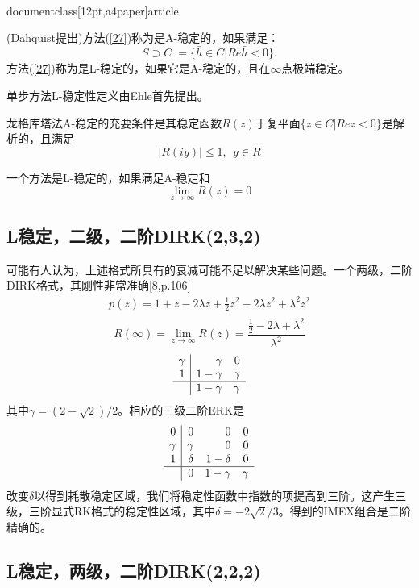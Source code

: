 \\documentclass[12pt,a4paper]{article}
\begin{document}
(Dahquist提出)方法(\ref{27})称为是A-稳定的，如果满足：
\begin{equation*}
S\supset C_{\_}=\{\bar{h}\in C|Re\bar{h}<0\}.
\end{equation*}
方法(\ref{27})称为是L-稳定的，如果它是A-稳定的，且在$\infty$点极端稳定。

单步方法L-稳定性定义由Ehle首先提出。

龙格库塔法A-稳定的充要条件是其稳定函数$R(z)$于复平面$\{z\in C|Rez<0\}$是解析的，且满足
\begin{equation}
|R(iy)|\le 1,~~y\in R
\end{equation}

一个方法是L-稳定的，如果满足A-稳定和
\begin{equation*}
\lim\limits_{z\to\infty}R(z)=0
\end{equation*}
\subsection{L稳定，二级，二阶DIRK(2,3,2)}

可能有人认为，上述格式所具有的衰减可能不足以解决某些问题。一个两级，二阶DIRK格式，其刚性非常准确[8,p.106]
\begin{gather*}
p(z)=1+z-2\lambda z+\frac{1}{2}z^2-2\lambda z^2+\lambda^2z^2\\
\end{gather*}
\begin{equation*}
R(\infty)=\lim\limits_{z\to \infty}R(z)=\frac{\frac{1}{2}-2\lambda+\lambda^2}{\lambda^2}
\end{equation*}
\[
\begin{array}{r|rr}
\gamma & \gamma & 0\\1 & 1-\gamma & \gamma\\
\hline
& 1-\gamma & \gamma
\end{array}
\]
其中$\gamma=(2-\sqrt{2})/2$。相应的三级二阶ERK是
\[
\begin{array}{r|rrr}
0 & 0 & 0 & 0\\
\gamma & \gamma & 0 & 0 \\
1 & \delta& 1-\delta & 0\\
\hline
& 0 & 1-\gamma & \gamma
\end{array}
\]
改变$\delta$以得到耗散稳定区域，我们将稳定性函数中指数的项提高到三阶。这产生三级，三阶显式RK格式的稳定性区域，其中$\delta=-2\sqrt{2}/3$。得到的IMEX组合是二阶精确的。

\subsection{L稳定，两级，二阶DIRK(2,2,2)}
\end{document}
